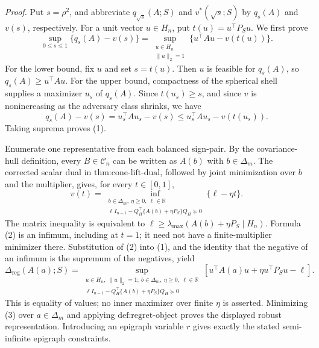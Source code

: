 \textit{Proof.}
Put \(s=\rho^2\), and abbreviate \(q_{\sqrt{s}}(A;S)\) and \(v^*(\sqrt{s};S)\) by \(q_s(A)\) and \(v(s)\), respectively. For a unit vector \(u\in H_n\), put \(t(u)=u^\top P_Su\). We first prove
\[
\sup_{0\leq s\leq1}\{q_s(A)-v(s)\}
=\sup_{\substack{u\in H_n\\\|u\|_2=1}}
\{u^\top Au-v(t(u))\}.
\tag{1}
\]
For the lower bound, fix \(u\) and set \(s=t(u)\). Then \(u\) is feasible for \(q_s(A)\), so \(q_s(A)\geq u^\top Au\). For the upper bound, compactness of the spherical shell supplies a maximizer \(u_s\) of \(q_s(A)\). Since \(t(u_s)\geq s\), and since \(v\) is nonincreasing as the adversary class shrinks, we have
\[
q_s(A)-v(s)
=u_s^\top Au_s-v(s)
\leq u_s^\top Au_s-v(t(u_s)).
\]
Taking suprema proves (1).

Enumerate one representative from each balanced sign-pair. By the covariance-hull definition, every \(B\in\mathcal C_n\) can be written as \(A(b)\) with \(b\in\Delta_m\). The corrected scalar dual in \(\text{thm:cone-lift-dual}\), followed by joint minimization over \(b\) and the multiplier, gives, for every \(t\in[0,1]\),
\[
v(t)=
\inf_{\substack{b\in\Delta_m,\ \eta\geq0,\ \ell\in\mathbb R\\
\ell I_{n-1}-Q_H^\top\{A(b)+\eta P_S\}Q_H\succeq0}}
\{\ell-\eta t\}.
\tag{2}
\]
The matrix inequality is equivalent to
\(\ell\geq\lambda_{\max}(A(b)+\eta P_S\mid H_n)\). Formula (2) is an infimum, including at \(t=1\); it need not have a finite-multiplier minimizer there. Substitution of (2) into (1), and the identity that the negative of an infimum is the supremum of the negatives, yield
\[
\Delta_{\mathrm{reg}}(A(a);S)
=\sup_{\substack{u\in H_n,\ \|u\|_2=1;\ b\in\Delta_m,\ \eta\geq0,\ \ell\in\mathbb R\\
\ell I_{n-1}-Q_H^\top\{A(b)+\eta P_S\}Q_H\succeq0}}
\left[u^\top A(a)u+\eta u^\top P_Su-\ell\right].
\tag{3}
\]
This is equality of values; no inner maximizer over finite \(\eta\) is asserted. Minimizing (3) over \(a\in\Delta_m\) and applying \(\text{def:regret-object}\) proves the displayed robust representation. Introducing an epigraph variable \(r\) gives exactly the stated semi-infinite epigraph constraints.

